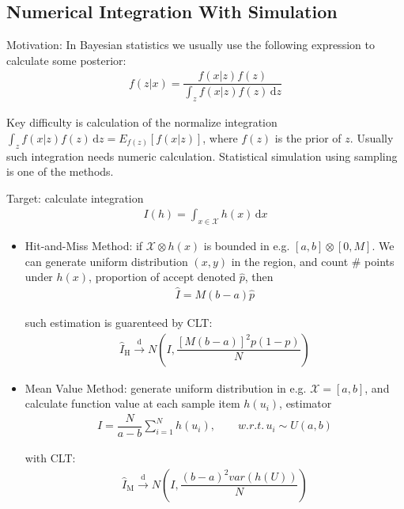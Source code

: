     


\subsection{Numerical Integration With Simulation}   
    Motivation: In Bayesian statistics we usually use the following expression to calculate some posterior:
    \begin{align}
        f(z|x)=\dfrac{f(x|z)f(z)}{\displaystyle \int_z f(x|z)f(z) \,\mathrm{d}z} 
    \end{align}
    
    Key difficulty is calculation of the normalize integration $ \displaystyle \int_z f(x|z)f(z) \,\mathrm{d}z =E_{f(z)}[f(x|z)]$, where $ f(z) $ is the prior of $ z $. Usually such integration needs numeric calculation. Statistical simulation using sampling is one of the methods.

    Target: calculate integration
    \begin{align}
        I(h)=\int_{x\in \mathcal{X} } h(x) \,\mathrm{d}x 
    \end{align}
    
\begin{itemize}[topsep=2pt,itemsep=0pt]
    \item Hit-and-Miss Method: if $ \mathcal{X}\otimes h(x) $ is bounded in e.g. $ [a,b]\otimes [0,M] $. We can generate uniform distribution $ (x,y) $ in the region, and count \# points under $ h(x) $, proportion of accept denoted $ \hat{p} $, then
    \begin{align}
        \hat{I}=M(b-a)\hat{p} 
    \end{align}

    such estimation is guarenteed by CLT:
    \begin{align}
        \hat{I}_\mathrm{H} \xrightarrow[]{\mathrm{d}} N\left( I,\dfrac{[M(b-a)]^2p(1-p)}{N} \right)
    \end{align}
    
    
    \item Mean Value Method: generate uniform distribution in e.g. $ \mathcal{X}=[a,b] $, and calculate function value at each sample item $ h(u_i) $, estimator
    \begin{align}
        \hat{I}=\dfrac{N}{a-b}\sum_{i=1}^Nh(u_i) ,\qquad w.r.t.\, u_i\sim U(a,b)
    \end{align}
    
    with CLT:
    \begin{align}
         \hat{I}_\mathrm{M} \xrightarrow[]{\mathrm{d}} N\left(I,\dfrac{(b-a)^2var(h(U))}{N}\right)
    \end{align}


\end{itemize}

